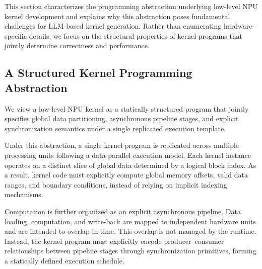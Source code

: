 This section characterizes the programming abstraction underlying low-level NPU kernel development and explains why this abstraction poses fundamental challenges for LLM-based kernel generation. Rather than enumerating hardware-specific details, we focus on the structural properties of kernel programs that jointly determine correctness and performance.

\subsection{A Structured Kernel Programming Abstraction}
\label{sec:kernel_abstraction}

We view a low-level NPU kernel as a statically structured program that jointly specifies global data partitioning, asynchronous pipeline stages, and explicit synchronization semantics under a single replicated execution template.

Under this abstraction, a single kernel program is replicated across multiple processing units following a data-parallel execution model. Each kernel instance operates on a distinct slice of global data determined by a logical block index. As a result, kernel code must explicitly compute global memory offsets, valid data ranges, and boundary conditions, instead of relying on implicit indexing mechanisms.

Computation is further organized as an explicit asynchronous pipeline. Data loading, computation, and write-back are mapped to independent hardware units and are intended to overlap in time. This overlap is not managed by the runtime. Instead, the kernel program must explicitly encode producer--consumer relationships between pipeline stages through synchronization primitives, forming a statically defined execution schedule.

